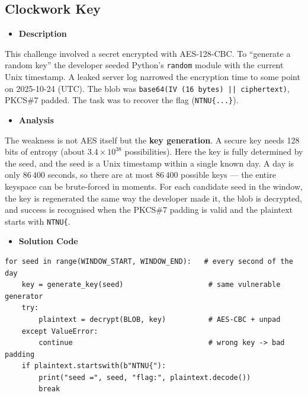\documentclass[11pt]{article}
\begin{document}
\subsection{Clockwork Key}

\begin{itemize}[leftmargin=1.5em]
    \item \textbf{Description}
\end{itemize}
\noindent This challenge involved a secret encrypted with AES-128-CBC. To ``generate a random key'' the developer seeded Python's \texttt{random} module with the current Unix timestamp. A leaked server log narrowed the encryption time to some point on 2025-10-24 (UTC). The blob was \texttt{base64(IV (16 bytes) || ciphertext)}, PKCS\#7 padded. The task was to recover the flag (\texttt{NTNU\{...\}}).

\begin{itemize}[leftmargin=1.5em]
    \item \textbf{Analysis}
\end{itemize}
\noindent The weakness is not AES itself but the \textbf{key generation}. A secure key needs 128 bits of entropy (about $3.4\times10^{38}$ possibilities). Here the key is fully determined by the seed, and the seed is a Unix timestamp within a single known day. A day is only $86\,400$ seconds, so there are at most $86\,400$ possible keys --- the entire keyspace can be brute-forced in moments. For each candidate seed in the window, the key is regenerated the same way the developer made it, the blob is decrypted, and success is recognised when the PKCS\#7 padding is valid and the plaintext starts with \texttt{NTNU\{}.

\begin{itemize}[leftmargin=1.5em]
    \item \textbf{Solution Code}
\end{itemize}
\begin{footnotesize}
\begin{verbatim}
for seed in range(WINDOW_START, WINDOW_END):   # every second of the day
    key = generate_key(seed)                    # same vulnerable generator
    try:
        plaintext = decrypt(BLOB, key)          # AES-CBC + unpad
    except ValueError:
        continue                                # wrong key -> bad padding
    if plaintext.startswith(b"NTNU{"):
        print("seed =", seed, "flag:", plaintext.decode())
        break
\end{verbatim}
\end{footnotesize}
\end{document}
